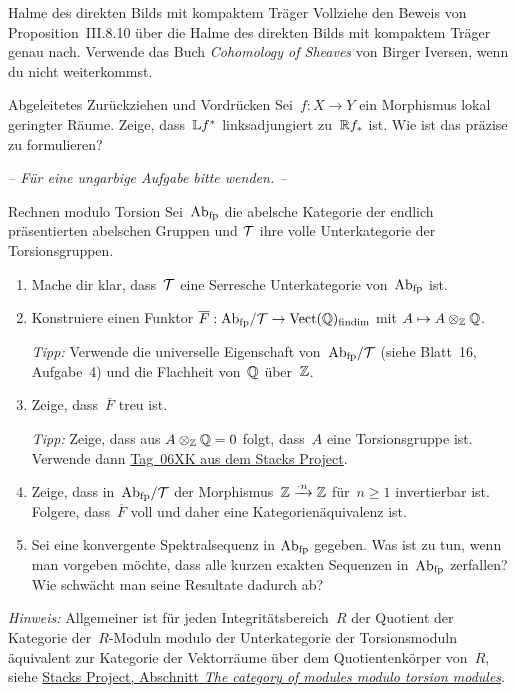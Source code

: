\documentclass{uebblatt}
\begin{document}
\begin{aufgabe}{Halme des direkten Bilds mit kompaktem Träger}
Vollziehe den Beweis von Proposition~III.8.10 über die Halme des direkten Bilds
mit kompaktem Träger genau nach. Verwende das Buch \emph{Cohomology of Sheaves}
von Birger Iversen, wenn du nicht weiterkommst.
\end{aufgabe}

\begin{aufgabe}{Abgeleitetes Zurückziehen und Vordrücken}
Sei~$f : X \to Y$ ein Morphismus lokal geringter Räume. Zeige, dass~$\mathbb{L} f^*$
linksadjungiert zu~$\mathbb{R} f_*$ ist. Wie ist das präzise zu formulieren?
\end{aufgabe}

\begin{center}\emph{-- Für eine ungarbige Aufgabe bitte wenden. --}\end{center}

\newpage

\begin{aufgabe}{Rechnen modulo Torsion}
Sei~$\mathrm{Ab}_\text{fp}$ die abelsche Kategorie der endlich präsentierten abelschen
Gruppen und $\mathcal{T}$ ihre volle Unterkategorie der Torsionsgruppen.
\begin{enumerate}
\item Mache dir klar, dass~$\mathcal{T}$ eine Serresche Unterkategorie
von~$\mathrm{Ab}_\text{fp}$ ist.
\item Konstruiere einen Funktor $\overline{F} : \mathrm{Ab}_\text{fp}/\mathcal{T} \to
\mathrm{Vect}(\mathbb{Q})_\text{findim}$ mit $A \mapsto A \otimes_{\mathbb{Z}} \mathbb{Q}$.

{\tiny\emph{Tipp:} Verwende die universelle Eigenschaft von~$\mathrm{Ab}_\text{fp}/\mathcal{T}$
(siehe Blatt~16, Aufgabe~4) und die Flachheit von~$\mathbb{Q}$ über~$\mathbb{Z}$.\par}

\item Zeige, dass~$\overline{F}$ treu ist.

{\tiny\emph{Tipp:} Zeige, dass aus $A \otimes_{\mathbb{Z}} \mathbb{Q} = 0$ folgt,
dass~$A$ eine Torsionsgruppe ist. Verwende dann
\href{http://stacks.math.columbia.edu/tag/06XK}{Tag~06XK aus dem Stacks
Project}.\par}
\item Zeige, dass in~$\mathrm{Ab}_\text{fp}/\mathcal{T}$ der Morphismus~$\mathbb{Z} \xrightarrow{\cdot
n} \mathbb{Z}$ für~$n \geq 1$ invertierbar ist. Folgere, dass~$\overline{F}$
voll und daher eine Kategorienäquivalenz ist.
\item Sei eine konvergente Spektralsequenz in $\mathrm{Ab}_\text{fp}$ gegeben. Was ist
zu tun, wenn man vorgeben möchte, dass alle kurzen exakten Sequenzen
in~$\mathrm{Ab}_\text{fp}$ zerfallen? Wie schwächt man seine Resultate dadurch ab?
\end{enumerate}

{\tiny\emph{Hinweis:} Allgemeiner ist für jeden Integritätsbereich~$R$ der
Quotient der Kategorie der~$R$-Moduln modulo der Unterkategorie der
Torsionsmoduln äquivalent zur Kategorie der Vektorräume über dem
Quotientenkörper von~$R$, siehe
\href{http://stacks.math.columbia.edu/tag/026Z}{Stacks Project, Abschnitt \emph{The
category of modules modulo torsion modules}}.\par}
\end{aufgabe}
\end{document}
